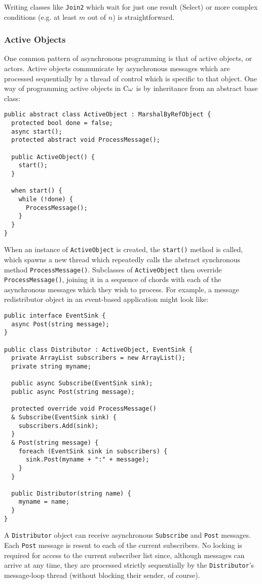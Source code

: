 \documentclass{article}
\newcommand{\comega}{\mbox{C$\omega$}}
\begin{document}
Writing classes like \verb|Join2| which wait for just one result
(Select) or more complex conditions (e.g. at least $m$ out of $n$) is
straightforward.

\subsubsection{Active Objects}
One common pattern of asynchronous programming is that of active
objects, or actors. Active objects communicate by asynchronous
messages which are processed sequentially by a thread of control which
is specific to that object. One way of programming active objects in
\comega\ is by inheritance from an abstract base class:
\begin{verbatim}
public abstract class ActiveObject : MarshalByRefObject {
  protected bool done = false;
  async start();
  protected abstract void ProcessMessage();
  
  public ActiveObject() {
    start();
  }
	   
  when start() {
    while (!done) {
      ProcessMessage();
    }
  }
}
\end{verbatim}
When an instance of \texttt{ActiveObject} is created, the \texttt{start()}
method is called, which spawns a new thread which repeatedly calls the
abstract synchronous method \texttt{ProcessMessage()}. Subclasses of
\texttt{ActiveObject} then override \texttt{ProcessMessage()}, joining it
in a sequence of chords with each of the asynchronous messages which
they wish to process. For example, a message redistributor object in
an event-based application might look like:
\begin{verbatim}
public interface EventSink {
  async Post(string message);
}

public class Distributor : ActiveObject, EventSink {
  private ArrayList subscribers = new ArrayList();
  private string myname;
  
  public async Subscribe(EventSink sink);
  public async Post(string message);
  
  protected override void ProcessMessage() 
  & Subscribe(EventSink sink) {
    subscribers.Add(sink);
  } 
  & Post(string message) {
    foreach (EventSink sink in subscribers) {
      sink.Post(myname + ":" + message);
    }
  }
  
  public Distributor(string name) {
    myname = name;
  }
}
\end{verbatim}
A \verb|Distributor| object can receive asynchronous \verb|Subscribe| and
\verb|Post| messages. Each \verb|Post| message is resent to
each of the current subscribers. No locking is required for access to
the current subscriber list since, although messages can arrive at any
time, they are processed strictly sequentially by the \verb|Distributor|'s
message-loop thread (without blocking their sender, of course).
\end{document}
